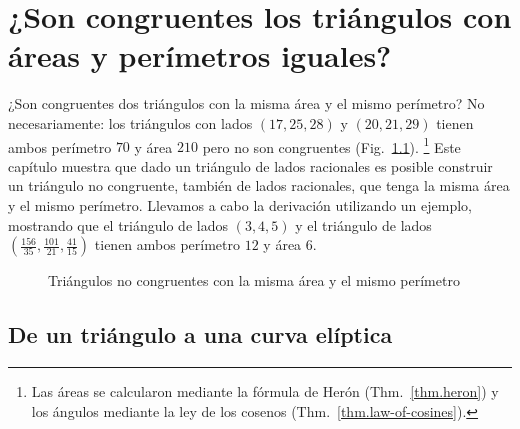 
\chapter{¿Son congruentes los triángulos con áreas y perímetros iguales?}\label{c.congruent}


¿Son congruentes dos triángulos con la misma área y el mismo perímetro? No necesariamente: los triángulos con lados $(17,25,28)$ y $(20,21,29)$ tienen ambos perímetro $70$ y área $210$ pero no son congruentes (Fig.~\ref{f.congruent-first-example}). \footnote{Las áreas se calcularon mediante la fórmula de Herón (Thm.~\ref{thm.heron}) y los ángulos mediante la ley de los cosenos (Thm.~\ref{thm.law-of-cosines}).} Este capítulo muestra que dado un triángulo de lados racionales es posible construir un triángulo no congruente, también de lados racionales, que tenga la misma área y el mismo perímetro.
Llevamos a cabo la derivación utilizando un ejemplo, mostrando que el triángulo de lados $(3,4,5)$ y el triángulo de lados 
$\left(\frac{156}{35}, \frac{101}{21}, \frac{41}{15}\right)$ tienen ambos perímetro $12$ y área $6$.

\begin{figure}[b]
\begin{center}
\end{center}
\caption{Triángulos no congruentes con la misma área y el mismo perímetro}\label{f.congruent-first-example}
\end{figure}

\section{De un triángulo a una curva elíptica}\label{s.elliptic}

